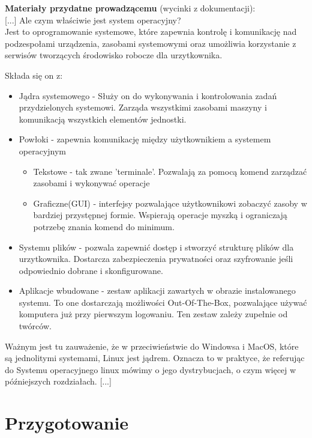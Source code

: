 \documentclass[10pt,a4paper]{article}
\begin{document}
\textbf{Materiały przydatne prowadzącemu} (wycinki z dokumentacji): \\

[...] Ale czym właściwie jest system operacyjny?\\

Jest to oprogramowanie systemowe, które zapewnia kontrolę i komunikację nad podzespołami urządzenia, zasobami systemowymi oraz umożliwia korzystanie z serwisów tworzących środowisko robocze dla urzytkownika.

Składa się on z:
\begin{itemize}
\item Jądra systemowego - Służy on do wykonywania i kontrolowania zadań przydzielonych systemowi. Zarząda wszystkimi zasobami maszyny i komunikacją wszystkich elementów jednostki.
\item Powłoki - zapewnia komunikację między użytkownikiem a systemem operacyjnym

\begin{itemize}
\item Tekstowe - tak zwane 'terminale'. Pozwalają za pomocą komend zarządzać zasobami i wykonywać operacje
\item Graficzne(GUI) - interfejsy pozwalające użytkownikowi zobaczyć zasoby w bardziej przystępnej formie. Wspierają operacje myszką i ograniczają potrzebę znania komend do minimum.
\end{itemize}

\item Systemu plików - pozwala zapewnić dostęp i stworzyć strukturę plików dla urzytkownika. Dostarcza zabezpieczenia prywatności oraz szyfrowanie jeśli odpowiednio dobrane i skonfigurowane.
\item Aplikacje wbudowane - zestaw aplikacji zawartych w obrazie instalowanego systemu. To one dostarczają możliwości Out-Of-The-Box, pozwalające używać komputera już przy pierwszym logowaniu. Ten zestaw zależy zupełnie od twórców.
\end{itemize}
	
Ważnym jest tu zauważenie, że w przeciwieństwie do Windowsa i MacOS, które są jednolitymi systemami, Linux jest jądrem. Oznacza to w praktyce, że referując do Systemu operacyjnego linux mówimy o jego dystrybucjach, o czym więcej w późniejszych rozdziałach. [...]

\section{Przygotowanie}
\end{document}
